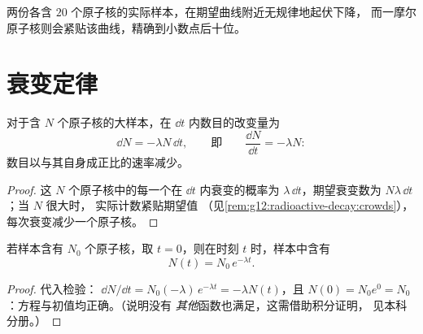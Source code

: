 \begin{omfigure}

{\small 两份各含 $20$ 个原子核的实际样本，在期望曲线附近无规律地起伏下降，
而一摩尔原子核则会紧贴该曲线，精确到小数点后十位。}
\end{omfigure}

\section{衰变定律}

\begin{proposition}[演化方程]\label{prop:g12:radioactive-decay:ode}
对于含 $N$ 个原子核的大样本，在 $\dd t$ 内数目的改变量为
\[
\dd N = -\lambda N\,\dd t, \qquad\text{即}\qquad \frac{\dd N}{\dd t} = -\lambda N :
\]
数目以与其自身成正比的速率减少。
\end{proposition}

\begin{proof}
这 $N$ 个原子核中的每一个在 $\dd t$ 内衰变的概率为
$\lambda\,\dd t$，期望衰变数为 $N\lambda\,\dd t$；当 $N$ 很大时，
实际计数紧贴期望值
（见\cref{rem:g12:radioactive-decay:crowds}），每次衰变减少一个原子核。
\end{proof}

\begin{theorem}[放射性衰变定律]\label{thm:g12:radioactive-decay:law}
若样本含有 $N_0$ 个原子核，取 $t = 0$，则在时刻 $t$ 时，样本中含有
\[
N(t) = N_0 \, e^{-\lambda t}.
\]
\end{theorem}

\begin{proof}
代入检验：
$\dd N/\dd t = N_0(-\lambda)\,e^{-\lambda t} = -\lambda N(t)$，且
$N(0) = N_0 e^0 = N_0$：方程与初值均正确。（说明没有
\emph{其他}函数也满足，这需借助积分证明，
见本科分册。）
\end{proof}

